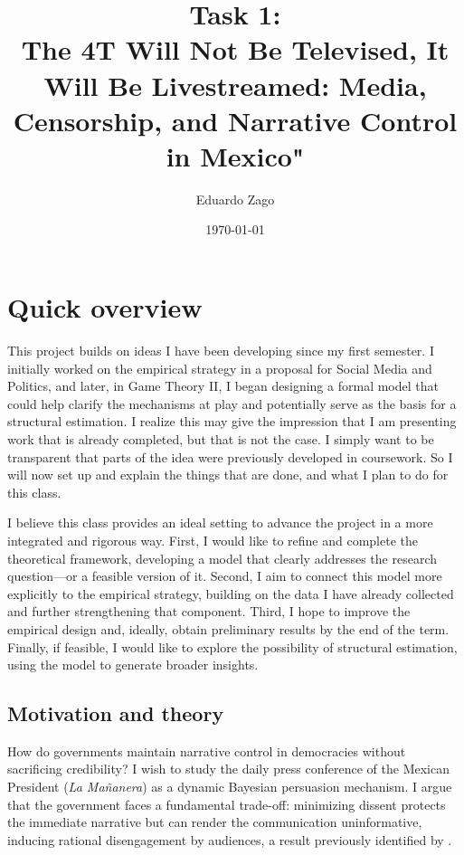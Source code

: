 \documentclass[11pt]{article}
\title{Task 1: \\ The 4T Will Not Be Televised, It Will Be Livestreamed: Media, Censorship, and Narrative Control in Mexico"}
\author{Eduardo Zago}
\date{\today}
\begin{document}
\maketitle

\section{Quick overview}

This project builds on ideas I have been developing since my first semester. I initially worked on the empirical strategy in a proposal for Social Media and Politics, and later, in Game Theory II, I began designing a formal model that could help clarify the mechanisms at play and potentially serve as the basis for a structural estimation. I realize this may give the impression that I am presenting work that is already completed, but that is not the case. I simply want to be transparent that parts of the idea were previously developed in coursework. So I will now set up and explain the things that are done, and what I plan to do for this class.

I believe this class provides an ideal setting to advance the project in a more integrated and rigorous way. First, I would like to refine and complete the theoretical framework, developing a model that clearly addresses the research question—or a feasible version of it. Second, I aim to connect this model more explicitly to the empirical strategy, building on the data I have already collected and further strengthening that component. Third, I hope to improve the empirical design and, ideally, obtain preliminary results by the end of the term. Finally, if feasible, I would like to explore the possibility of structural estimation, using the model to generate broader insights.

\subsection{Motivation and theory}

How do governments maintain narrative control in democracies without sacrificing credibility? I wish to study the daily press conference of the Mexican President (\textit{La Mañanera}) as a dynamic Bayesian persuasion mechanism. I argue that the government faces a fundamental trade-off: minimizing dissent protects the immediate narrative but can render the communication uninformative, inducing rational disengagement by audiences, a result previously identified by \citep{Censor-Pratt-AER, GehlbachSonin2014}. 
\end{document}
